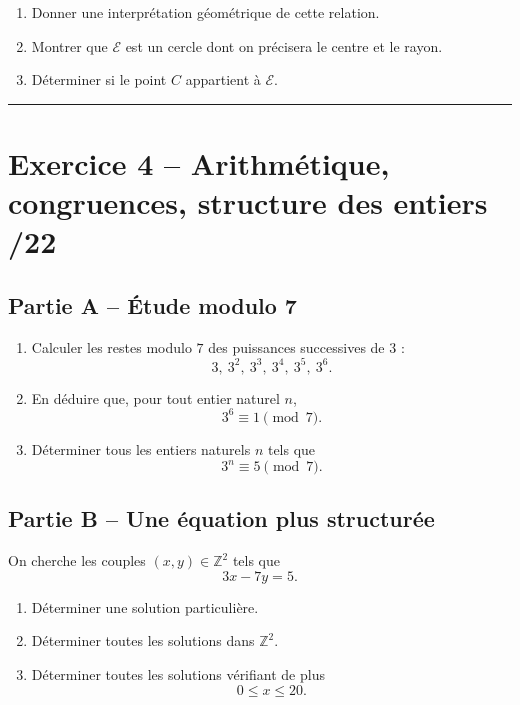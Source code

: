 \documentclass[11pt,a4paper]{article}
\newcommand{\Z}{\mathbb{Z}}
\begin{document}
\begin{enumerate}[label=\textbf{3.\arabic*}, resume, leftmargin=1.6em]
    \item Donner une interprétation géométrique de cette relation.
    \item Montrer que \(\mathcal E\) est un cercle dont on précisera le centre et le rayon.
    \item Déterminer si le point \(C\) appartient à \(\mathcal E\).
\end{enumerate}

\vspace{0.5em}
\hrule
\vspace{0.6em}

\section*{Exercice 4 -- Arithmétique, congruences, structure des entiers \hfill /22}

\subsection*{Partie A -- Étude modulo 7}
\begin{enumerate}[label=\textbf{4.\arabic*}, leftmargin=1.6em]
    \item Calculer les restes modulo \(7\) des puissances successives de \(3\) :
    \[
    3,\ 3^2,\ 3^3,\ 3^4,\ 3^5,\ 3^6.
    \]
    \item En déduire que, pour tout entier naturel \(n\),
    \[
    3^6\equiv 1 \pmod 7.
    \]
    \item Déterminer tous les entiers naturels \(n\) tels que
    \[
    3^n\equiv 5 \pmod 7.
    \]
\end{enumerate}

\subsection*{Partie B -- Une équation plus structurée}
On cherche les couples \((x,y)\in\Z^2\) tels que
\[
3x-7y=5.
\]

\begin{enumerate}[label=\textbf{4.\arabic*}, resume, leftmargin=1.6em]
    \item Déterminer une solution particulière.
    \item Déterminer toutes les solutions dans \(\Z^2\).
    \item Déterminer toutes les solutions vérifiant de plus
    \[
    0\le x\le 20.
    \]
\end{enumerate}
\end{document}
